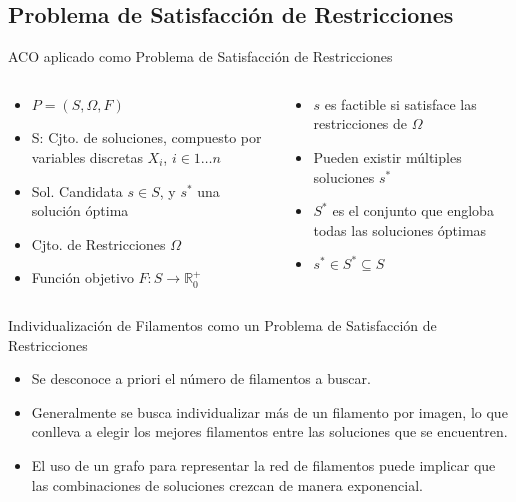 \subsection{Problema de Satisfacci\'on de Restricciones}
\begin{frame}{ACO aplicado como Problema de Satisfacci\'on de Restricciones}
  \begin{columns}
    \begin{column}{0.5\textwidth}
        \begin{itemize}
          \item $P = (S, \Omega, F)$
          \item S:  Cjto. de soluciones, compuesto por variables discretas $X_{i}$, $i \in 1 \dotsc n$
          \item Sol. Candidata $s \in S$, y $s^{*}$ una soluci\'on \'optima
          \item Cjto. de Restricciones $\Omega$
          \item Funci\'on objetivo $F: S\rightarrow \mathbb R_{0}^{+}$
          
      \end{itemize}
    \end{column}
    \begin{column}{0.5\textwidth}
      \begin{itemize}
          \item $s$ es factible si satisface las restricciones de $\Omega$
          \item Pueden existir m\'ultiples soluciones $s^{*}$
          \item $S^{*}$ es el conjunto que engloba todas las soluciones \'optimas
          \item $s^{*} \in S^{*} \subseteq S$
      \end{itemize}
    \end{column}
\end{columns}
\end{frame}


\begin{frame}{Individualizaci\'on de Filamentos como un Problema de Satisfacci\'on de Restricciones}
    \begin{itemize}
    \item Se desconoce a priori el n\'umero de filamentos a buscar.%
    \item Generalmente se busca individualizar m\'as de un filamento por imagen, lo que conlleva a elegir los mejores filamentos entre las soluciones que se encuentren.
    \item El uso de un grafo para representar la red de filamentos puede implicar que las combinaciones de soluciones crezcan de manera exponencial.
\end{itemize}
\end{frame}


